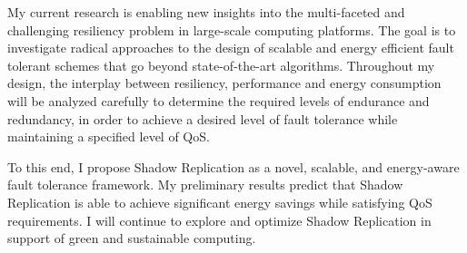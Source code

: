 
My current research is enabling new insights into the multi-faceted and challenging resiliency problem in large-scale computing platforms. The goal is to investigate radical approaches to the design of
scalable and energy efficient fault tolerant schemes that go beyond state-of-the-art algorithms. Throughout my design, the interplay between resiliency, performance and energy consumption will be analyzed carefully to determine the required levels of
endurance and redundancy, in order to achieve a desired level of fault tolerance while maintaining a specified level of QoS.


To this end, I propose Shadow Replication as a novel, scalable, and energy-aware fault tolerance framework.
My preliminary results predict that Shadow Replication is able to achieve significant energy savings while satisfying QoS requirements. I will continue to explore and optimize Shadow Replication in support of green and sustainable computing.
